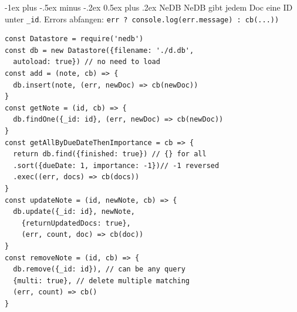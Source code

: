 \documentclass[a4paper, fontsize=6pt]{scrartcl}
\makeatletter
\renewcommand{\section}{\@startsection{section}{1}{0mm}%
    {-1ex plus -.5ex minus -.2ex}%
    {0.5ex plus .2ex}%
    {\normalfont\large\bfseries}}
\newcommand{\js}[1]{\texttt{#1}}
\makeatother
\begin{document}
\begin{multicols*}{5}
\section{NeDB}
NeDB gibt jedem Doc eine ID unter \texttt{\_id}. Errors abfangen: \js{err ? console.log(err.message) : cb(...))}
\begin{verbatim}
const Datastore = require('nedb')
const db = new Datastore({filename: './d.db',
  autoload: true}) // no need to load
const add = (note, cb) => {
  db.insert(note, (err, newDoc) => cb(newDoc))
}
const getNote = (id, cb) => {
  db.findOne({_id: id}, (err, newDoc) => cb(newDoc))
}
const getAllByDueDateThenImportance = cb => {
  return db.find({finished: true}) // {} for all
  .sort({dueDate: 1, importance: -1})// -1 reversed
  .exec((err, docs) => cb(docs))
}
const updateNote = (id, newNote, cb) => {
  db.update({_id: id}, newNote, 
    {returnUpdatedDocs: true},
    (err, count, doc) => cb(doc))
}
const removeNote = (id, cb) => {
  db.remove({_id: id}), // can be any query
  {multi: true}, // delete multiple matching
  (err, count) => cb()
}
\end{verbatim}


\end{multicols*}
\end{document}
